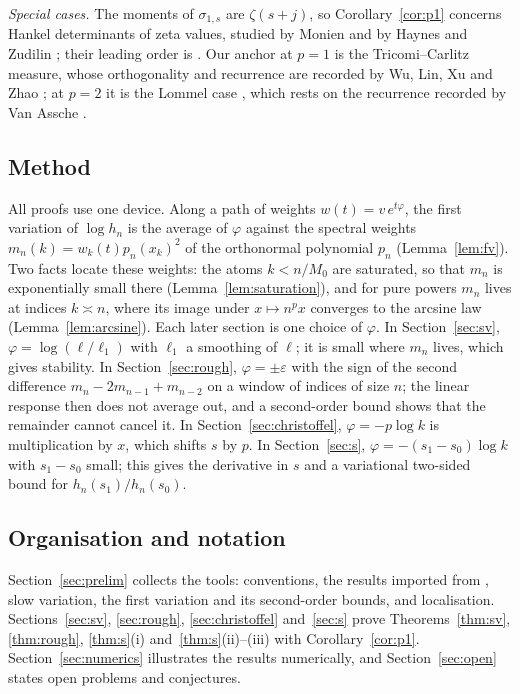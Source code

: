 \emph{Special cases.} The moments of $\sigma_{1,s}$ are $\zeta(s+j)$, so Corollary~\ref{cor:p1} concerns Hankel
determinants of zeta values, studied by Monien \cite{Monien} and by Haynes and Zudilin \cite{HaynesZudilin}; their
leading order is \cite[Corollary~1.4]{PaperI}. Our anchor at $p=1$ is the Tricomi--Carlitz measure, whose
orthogonality and recurrence are recorded by Wu, Lin, Xu and Zhao \cite[(1.4)--(1.9)]{WLXZ}; at $p=2$ it is the
Lommel case \cite[Remark~1.6]{PaperII}, which rests on the recurrence recorded by Van Assche \cite[\S3]{VA}.

\subsection{Method}\label{sec:method}
All proofs use one device. Along a path of weights $w(t)=v\,e^{t\varphi}$, the first variation of $\log h_n$ is
the average of $\varphi$ against the spectral weights $m_n(k)=w_k(t)p_n(x_k)^2$ of the orthonormal polynomial $p_n$
(Lemma~\ref{lem:fv}). Two facts locate these weights: the atoms $k<n/M_0$ are saturated, so that $m_n$ is
exponentially small there (Lemma~\ref{lem:saturation}), and for pure powers $m_n$ lives at indices $k\asymp n$, where its
image under $x\mapsto n^px$ converges to the arcsine law (Lemma~\ref{lem:arcsine}). Each later section is one choice
of $\varphi$. In Section~\ref{sec:sv}, $\varphi=\log(\ell/\ell_1)$ with $\ell_1$ a smoothing of $\ell$; it is small
where $m_n$ lives, which gives stability. In Section~\ref{sec:rough}, $\varphi=\pm\varepsilon$ with the sign of the
second difference $m_n-2m_{n-1}+m_{n-2}$ on a window of indices of size $n$; the linear response then does not
average out, and a second-order bound shows that the remainder cannot cancel it. In Section~\ref{sec:christoffel},
$\varphi=-p\log k$ is multiplication by $x$, which shifts $s$ by $p$. In Section~\ref{sec:s}, $\varphi=-(s_1-s_0)\log
k$ with $s_1-s_0$ small; this gives the derivative in $s$ and a variational two-sided bound for $h_n(s_1)/h_n(s_0)$.

\subsection{Organisation and notation}\label{sec:organisation}
Section~\ref{sec:prelim} collects the tools: conventions, the results imported from \cite{PaperI,PaperII},
slow variation, the first variation and its second-order bounds, and localisation. Sections~\ref{sec:sv},
\ref{sec:rough}, \ref{sec:christoffel} and~\ref{sec:s} prove Theorems~\ref{thm:sv}, \ref{thm:rough},
\ref{thm:s}(i) and~\ref{thm:s}(ii)--(iii) with Corollary~\ref{cor:p1}. Section~\ref{sec:numerics} illustrates the
results numerically, and Section~\ref{sec:open} states open problems and conjectures.

